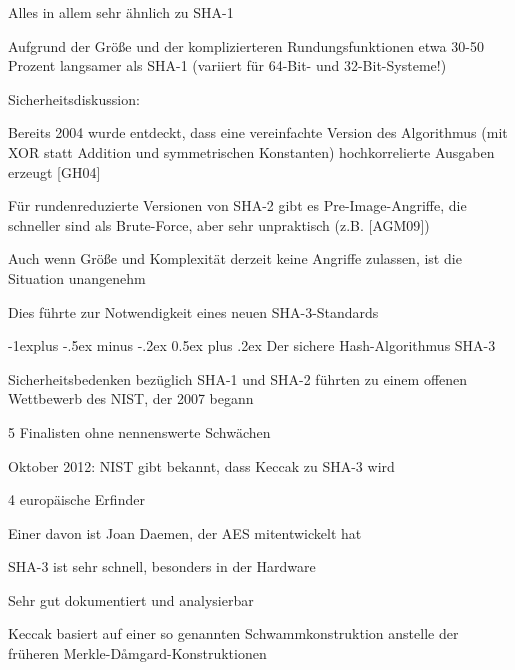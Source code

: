 \documentclass[a4paper]{article}
\makeatletter
\renewcommand{\subsection}{\@startsection{subsection}{2}{0mm}%
 {-1explus -.5ex minus -.2ex}%
 {0.5ex plus .2ex}%
 {\normalfont\normalsize\bfseries}}
\makeatother
\begin{document}
\begin{multicols}{3}
\begin{itemize*}
            \begin{itemize*}
                  \item Alles in allem sehr ähnlich zu SHA-1
                  \item Aufgrund der Größe und der komplizierteren Rundungsfunktionen etwa 30-50 Prozent langsamer als SHA-1 (variiert für 64-Bit- und 32-Bit-Systeme!)
                  \item Sicherheitsdiskussion:
                  \begin{itemize*} \item Bereits 2004 wurde entdeckt, dass eine vereinfachte Version des Algorithmus (mit XOR statt Addition und symmetrischen Konstanten) hochkorrelierte Ausgaben erzeugt {[}GH04{]} \item Für rundenreduzierte Versionen von SHA-2 gibt es Pre-Image-Angriffe, die schneller sind als Brute-Force, aber sehr unpraktisch (z.B. {[}AGM09{]}) \item Auch wenn Größe und Komplexität derzeit keine Angriffe zulassen, ist die Situation unangenehm \item Dies führte zur Notwendigkeit eines neuen SHA-3-Standards \end{itemize*}
            \end{itemize*}
      \end{itemize*}


      \subsection{Der sichere Hash-Algorithmus
            SHA-3}

      \begin{itemize*}
            \item
            Sicherheitsbedenken bezüglich SHA-1 und SHA-2 führten zu einem offenen
            Wettbewerb des NIST, der 2007 begann

            \begin{itemize*}
                  \item 5 Finalisten ohne nennenswerte Schwächen
                  \item Oktober 2012: NIST gibt bekannt, dass Keccak zu SHA-3 wird
                  \item 4 europäische Erfinder
                  \item Einer davon ist Joan Daemen, der AES mitentwickelt hat
                  \item SHA-3 ist sehr schnell, besonders in der Hardware
                  \item Sehr gut dokumentiert und analysierbar
            \end{itemize*}
            \item
            Keccak basiert auf einer so genannten Schwammkonstruktion anstelle der
            früheren Merkle-Dåmgard-Konstruktionen


\end{itemize*}
\end{multicols}
\end{document}
